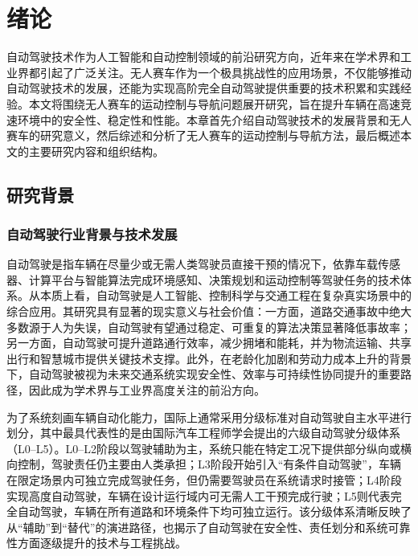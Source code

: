 \chapter{绪论}
自动驾驶技术作为人工智能和自动控制领域的前沿研究方向，近年来在学术界和工业界都引起了广泛关注。无人赛车作为一个极具挑战性的应用场景，不仅能够推动自动驾驶技术的发展，还能为实现高阶完全自动驾驶提供重要的技术积累和实践经验。本文将围绕无人赛车的运动控制与导航问题展开研究，旨在提升车辆在高速竞速环境中的安全性、稳定性和性能。本章首先介绍自动驾驶技术的发展背景和无人赛车的研究意义，然后综述和分析了无人赛车的运动控制与导航方法，最后概述本文的主要研究内容和组织结构。
\section{研究背景}
\subsection{自动驾驶行业背景与技术发展}
自动驾驶是指车辆在尽量少或无需人类驾驶员直接干预的情况下，依靠车载传感器、计算平台与智能算法完成环境感知、决策规划和运动控制等驾驶任务的技术体系\cite{pendleton2017perception}。从本质上看，自动驾驶是人工智能、控制科学与交通工程在复杂真实场景中的综合应用。其研究具有显著的现实意义与社会价值：一方面，道路交通事故中绝大多数源于人为失误，自动驾驶有望通过稳定、可重复的算法决策显著降低事故率\cite{fagnant2015preparing}；另一方面，自动驾驶可提升道路通行效率，减少拥堵和能耗，并为物流运输、共享出行和智慧城市提供关键技术支撑\cite{olayode2023systematic}。此外，在老龄化加剧和劳动力成本上升的背景下，自动驾驶被视为未来交通系统实现安全性、效率与可持续性协同提升的重要路径，因此成为学术界与工业界高度关注的前沿方向。

为了系统刻画车辆自动化能力，国际上通常采用分级标准对自动驾驶自主水平进行划分，其中最具代表性的是由国际汽车工程师学会提出的六级自动驾驶分级体系（L0–L5）\cite{J3016_202104}。L0–L2阶段以驾驶辅助为主，系统只能在特定工况下提供部分纵向或横向控制\cite{xu2017correctness}，驾驶责任仍主要由人类承担；L3阶段开始引入“有条件自动驾驶”，车辆在限定场景内可独立完成驾驶任务，但仍需要驾驶员在系统请求时接管\cite{morales2020automated}；L4阶段实现高度自动驾驶，车辆在设计运行域内可无需人工干预完成行驶\cite{scanlon2021waymo}；L5则代表完全自动驾驶，车辆在所有道路和环境条件下均可独立运行\cite{khan2022level}。该分级体系清晰反映了从“辅助”到“替代”的演进路径，也揭示了自动驾驶在安全性、责任划分和系统可靠性方面逐级提升的技术与工程挑战。

